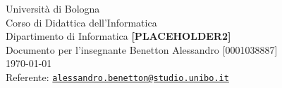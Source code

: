\documentclass[../../docenti.tex]{subfiles}
\begin{document}
\begin{titlepage}
    \begin{center}
    {
        \LARGE{
            Università di Bologna \\ [1ex]
            Corso di Didattica dell'Informatica \\ Dipartimento di Informatica
        }
        \vfill
        {\huge
            \textbf{[PLACEHOLDER2]}
        }
        \\ [1ex]
        {\large 
            Documento per l'insegnante
        }
        \vfill
        {\large   
            Benetton Alessandro [0001038887]\\[0.75ex]
            
        \vfill
        \today
        \\[4ex]
        Referente: \href{mailto:alessandro.benetton@studio.unibo.it}{\tt alessandro.benetton@studio.unibo.it}
        }
    }
    \end{center}
\end{titlepage}
\end{document}
